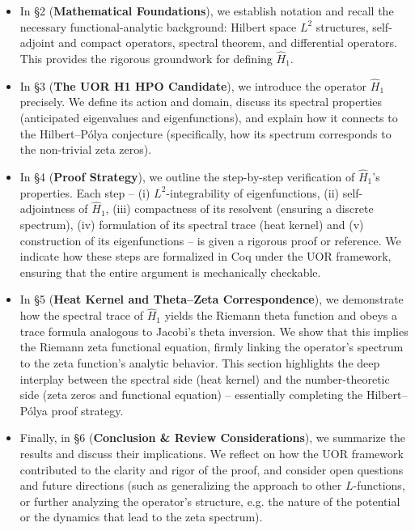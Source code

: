 \documentclass[12pt]{article}
\theoremstyle{plain}
\theoremstyle{definition}
\begin{document}
\begin{itemize}[leftmargin=*, labelsep=5mm]
    \item In \S2 (\textbf{Mathematical Foundations}), we establish notation and recall the necessary functional-analytic background: Hilbert space \(L^2\) structures, self-adjoint and compact operators, spectral theorem, and differential operators. This provides the rigorous groundwork for defining \(\hat{H}_1\).
    \item In \S3 (\textbf{The UOR H1 HPO Candidate}), we introduce the operator \(\hat{H}_1\) precisely. We define its action and domain, discuss its spectral properties (anticipated eigenvalues and eigenfunctions), and explain how it connects to the Hilbert--P\'olya conjecture (specifically, how its spectrum corresponds to the non-trivial zeta zeros).
    \item In \S4 (\textbf{Proof Strategy}), we outline the step-by-step verification of \(\hat{H}_1\)'s properties. Each step -- (i) \(L^2\)-integrability of eigenfunctions, (ii) self-adjointness of \(\hat{H}_1\), (iii) compactness of its resolvent (ensuring a discrete spectrum), (iv) formulation of its spectral trace (heat kernel) and (v) construction of its eigenfunctions -- is given a rigorous proof or reference. We indicate how these steps are formalized in Coq under the UOR framework, ensuring that the entire argument is mechanically checkable.
    \item In \S5 (\textbf{Heat Kernel and Theta--Zeta Correspondence}), we demonstrate how the spectral trace of \(\hat{H}_1\) yields the Riemann theta function and obeys a trace formula analogous to Jacobi's theta inversion. We show that this implies the Riemann zeta functional equation, firmly linking the operator's spectrum to the zeta function's analytic behavior. This section highlights the deep interplay between the spectral side (heat kernel) and the number-theoretic side (zeta zeros and functional equation) -- essentially completing the Hilbert--P\'olya proof strategy.
    \item Finally, in \S6 (\textbf{Conclusion \& Review Considerations}), we summarize the results and discuss their implications. We reflect on how the UOR framework contributed to the clarity and rigor of the proof, and consider open questions and future directions (such as generalizing the approach to other \(L\)-functions, or further analyzing the operator's structure, e.g. the nature of the potential or the dynamics that lead to the zeta spectrum).
\end{itemize}
\end{document}

